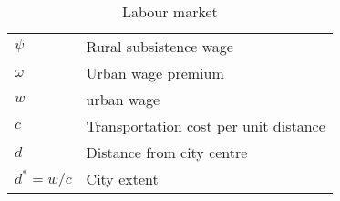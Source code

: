 \begin{longtable}{lp{10cm}}
\caption{Labour market}                                                            \\
\hline
$\psi$            &  Rural subsistence wage \\  
$\omega$          &  Urban wage premium          \\
$w$               &  urban wage \\ 
${c}$             &  Transportation cost per unit distance \\ %
$d$               &  Distance from city centre   \\
$d^* = w/{c}$     &  City extent \\ %

\hline
\end{longtable}

